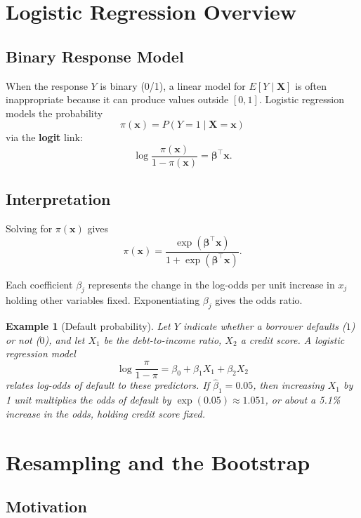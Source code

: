 \documentclass[11pt,a4paper]{article}
\newtheorem{example}{Example}[section]
\begin{document}
\section{Logistic Regression Overview}

\subsection{Binary Response Model}

When the response $Y$ is binary (0/1), a linear model for $E[Y\mid \bm{X}]$ is often inappropriate because it can produce values outside $[0,1]$. 
Logistic regression models the probability
\[
\pi(\bm{x}) = P(Y=1 \mid \bm{X}=\bm{x})
\]
via the \textbf{logit} link:
\[
\log\frac{\pi(\bm{x})}{1 - \pi(\bm{x})} = \bm{\beta}^\top \bm{x}.
\]

\subsection{Interpretation}

Solving for $\pi(\bm{x})$ gives
\[
\pi(\bm{x})
= \frac{\exp(\bm{\beta}^\top \bm{x})}{1 + \exp(\bm{\beta}^\top \bm{x})}.
\]

Each coefficient $\beta_j$ represents the change in the log-odds per unit increase in $x_j$ holding other variables fixed. 
Exponentiating $\beta_j$ gives the odds ratio.

\begin{example}[Default probability]
Let $Y$ indicate whether a borrower defaults ($1$) or not ($0$), and let $X_1$ be the debt-to-income ratio, $X_2$ a credit score. 
A logistic regression model
\[
\log\frac{\pi}{1-\pi} = \beta_0 + \beta_1 X_1 + \beta_2 X_2
\]
relates log-odds of default to these predictors. 
If $\hat{\beta}_1 = 0.05$, then increasing $X_1$ by 1 unit multiplies the odds of default by $\exp(0.05) \approx 1.051$, or about a 5.1\% increase in the odds, holding credit score fixed.

\end{example}

\newpage

\section{Resampling and the Bootstrap}
\label{sec:bootstrap}

\subsection{Motivation}
\end{document}
